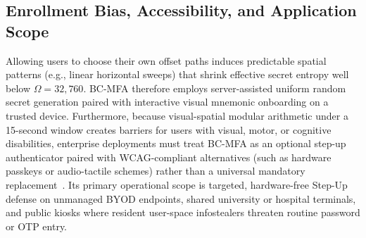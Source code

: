 \subsection{Enrollment Bias, Accessibility, and Application Scope}
Allowing users to choose their own offset paths induces predictable spatial patterns (e.g., linear horizontal sweeps) that shrink effective secret entropy well below $\Omega = 32{,}760$. BC-MFA therefore employs server-assisted uniform random secret generation paired with interactive visual mnemonic onboarding on a trusted device. Furthermore, because visual-spatial modular arithmetic under a 15-second window creates barriers for users with visual, motor, or cognitive disabilities, enterprise deployments must treat BC-MFA as an optional step-up authenticator paired with WCAG-compliant alternatives (such as hardware passkeys or audio-tactile schemes) rather than a universal mandatory replacement~\cite{mahfouz2025passkeys}. Its primary operational scope is targeted, hardware-free Step-Up defense on unmanaged BYOD endpoints, shared university or hospital terminals, and public kiosks where resident user-space infostealers threaten routine password or OTP entry.
